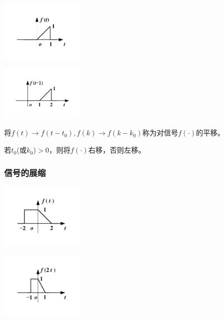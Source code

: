\begin{Figure}[信号的平移]
    \begin{FigureSub}[平移前原始信号$f(t)$]
        \includegraphics[width=40mm]{visio/1.8-a.pdf}
    \end{FigureSub}
    \begin{FigureSub}[平移信号$f(t-1)$]
        \includegraphics[width=40mm]{visio/1.8-b.pdf}
    \end{FigureSub}
\end{Figure}

\begin{BoxDefinition}[信号的平移]
    将$f(t)\rightarrow f(t-t_0),f(k)\rightarrow f(k-k_0)$称为对信号$f(\cdot)$的平移。

    若$t_0$(或$k_0$)$>0$，则将$f(\cdot)$右移，否则左移。
\end{BoxDefinition}

\subsubsection{信号的展缩}

\begin{Figure}[信号的展缩]
    \begin{FigureSub}[压缩前原始信号$f(t)$]
        \includegraphics[width=40mm]{visio/1.9-a.pdf}
    \end{FigureSub}
    \begin{FigureSub}[压缩信号$f(2t)$]
        \includegraphics[width=40mm]{visio/1.9-b.pdf}
    \end{FigureSub}
\end{Figure}


